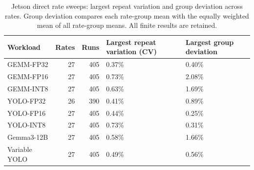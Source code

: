 \begin{table}[htbp]
\centering
\small
\caption{Jetson direct rate sweeps: largest repeat variation and group deviation across rates. Group deviation compares each rate-group mean with the equally weighted mean of all rate-group means. All finite results are retained.}
\label{tab:rate-results}
\begin{tabular}{@{}lrrR{.23\textwidth}R{.23\textwidth}@{}}
\toprule
Workload & Rates & Runs & Largest repeat variation (CV) & Largest group deviation \\
\midrule
GEMM-FP32 & 27 & 405 & 0.37\% & 0.40\% \\
GEMM-FP16 & 27 & 405 & 0.73\% & 2.08\% \\
GEMM-INT8 & 27 & 405 & 0.63\% & 1.69\% \\
YOLO-FP32 & 26 & 390 & 0.41\% & 0.89\% \\
YOLO-FP16 & 27 & 405 & 0.44\% & 0.25\% \\
YOLO-INT8 & 27 & 405 & 0.73\% & 0.31\% \\
Gemma3-12B & 27 & 405 & 0.58\% & 1.66\% \\
Variable YOLO & 27 & 405 & 0.49\% & 0.56\% \\
\bottomrule
\end{tabular}
\end{table}

